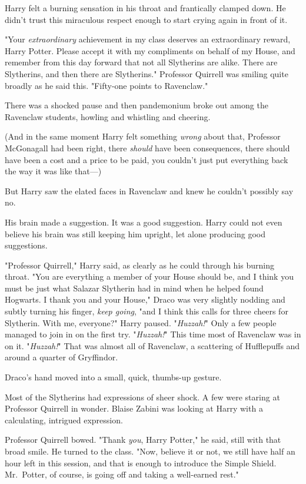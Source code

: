 Harry felt a burning sensation in his throat and frantically clamped down. He
didn't trust this miraculous respect enough to start crying again in front of
it.

"Your \emph{extraordinary} achievement in my class deserves an extraordinary
reward, Harry Potter. Please accept it with my compliments on behalf of my
House, and remember from this day forward that not all Slytherins are alike.
There are Slytherins, and then there are Slytherins." Professor Quirrell was
smiling quite broadly as he said this. "Fifty-one points to Ravenclaw."

There was a shocked pause and then pandemonium broke out among the Ravenclaw
students, howling and whistling and cheering.

(And in the same moment Harry felt something \emph{wrong} about that, Professor
McGonagall had been right, there \emph{should} have been consequences, there
should have been a cost and a price to be paid, you couldn't just put
everything back the way it was like that---)

But Harry saw the elated faces in Ravenclaw and knew he couldn't possibly say
no.

His brain made a suggestion. It was a good suggestion. Harry could not even
believe his brain was still keeping him upright, let alone producing good
suggestions.

"Professor Quirrell," Harry said, as clearly as he could through his burning
throat. "You are everything a member of your House should be, and I think you
must be just what Salazar Slytherin had in mind when he helped found Hogwarts.
I thank you and your House," Draco was very slightly nodding and subtly turning
his finger, \emph{keep going}, "and I think this calls for three cheers for
Slytherin. With me, everyone?" Harry paused. "\emph{Huzzah!}" Only a few people
managed to join in on the first try. "\emph{Huzzah!}" This time most of
Ravenclaw was in on it. "\emph{Huzzah!}" That was almost all of Ravenclaw, a
scattering of Hufflepuffs and around a quarter of Gryffindor.

Draco's hand moved into a small, quick, thumbs-up gesture.

Most of the Slytherins had expressions of sheer shock. A few were staring at
Professor Quirrell in wonder. Blaise Zabini was looking at Harry with a
calculating, intrigued expression.

Professor Quirrell bowed. "Thank \emph{you}, Harry Potter," he said, still with
that broad smile. He turned to the class. "Now, believe it or not, we still
have half an hour left in this session, and that is enough to introduce the
Simple Shield. Mr.~Potter, of course, is going off and taking a well-earned
rest."

